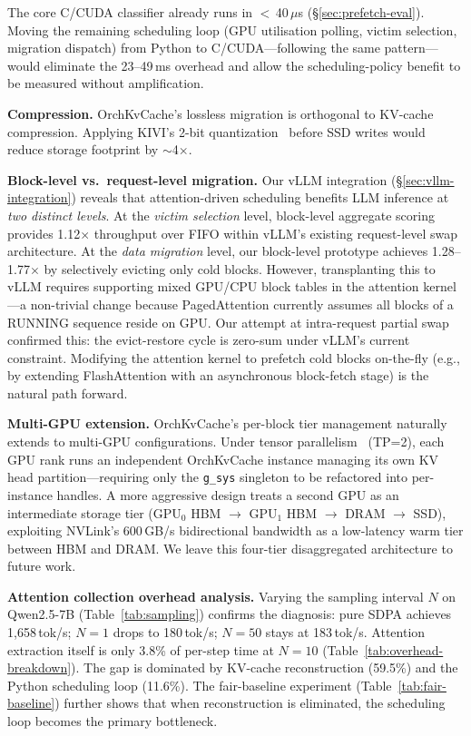 \documentclass[conference]{IEEEtran}
\begin{document}
The core C/CUDA classifier already runs in $<$\,40\,$\mu$s (\S\ref{sec:prefetch-eval}).  Moving the remaining scheduling loop (GPU utilisation polling, victim selection, migration dispatch) from Python to C/CUDA---following the same pattern---would eliminate the 23--49\,ms overhead and allow the scheduling-policy benefit to be measured without amplification.

\textbf{Compression.} OrchKvCache's lossless migration is orthogonal to KV-cache compression. Applying KIVI's 2-bit quantization~\cite{kivi} before SSD writes would reduce storage footprint by ${\sim}$4$\times$.

\textbf{Block-level vs.\ request-level migration.}
\label{sec:discussion}
Our vLLM integration (\S\ref{sec:vllm-integration}) reveals that attention-driven scheduling benefits LLM inference at \emph{two distinct levels}. At the \emph{victim selection} level, block-level aggregate scoring provides 1.12$\times$ throughput over FIFO within vLLM's existing request-level swap architecture. At the \emph{data migration} level, our block-level prototype achieves 1.28--1.77$\times$ by selectively evicting only cold blocks. However, transplanting this to vLLM requires supporting mixed GPU/CPU block tables in the attention kernel---a non-trivial change because PagedAttention currently assumes all blocks of a RUNNING sequence reside on GPU. Our attempt at intra-request partial swap confirmed this: the evict-restore cycle is zero-sum under vLLM's current constraint. Modifying the attention kernel to prefetch cold blocks on-the-fly (e.g., by extending FlashAttention with an asynchronous block-fetch stage) is the natural path forward.

\textbf{Multi-GPU extension.} OrchKvCache's per-block tier management naturally extends to multi-GPU configurations. Under tensor parallelism~\cite{megatron} (TP=2), each GPU rank runs an independent OrchKvCache instance managing its own KV head partition---requiring only the \texttt{g\_sys} singleton to be refactored into per-instance handles. A more aggressive design treats a second GPU as an intermediate storage tier (GPU$_0$ HBM $\to$ GPU$_1$ HBM $\to$ DRAM $\to$ SSD), exploiting NVLink's 600\,GB/s bidirectional bandwidth as a low-latency warm tier between HBM and DRAM. We leave this four-tier disaggregated architecture to future work.

\textbf{Attention collection overhead analysis.}
Varying the sampling interval $N$ on Qwen2.5-7B (Table~\ref{tab:sampling}) confirms the diagnosis: pure SDPA achieves 1,658\,tok/s; $N{=}1$ drops to 180\,tok/s; $N{=}50$ stays at 183\,tok/s.  Attention extraction itself is only 3.8\% of per-step time at $N{=}10$ (Table~\ref{tab:overhead-breakdown}).  The gap is dominated by KV-cache reconstruction (59.5\%) and the Python scheduling loop (11.6\%).  The fair-baseline experiment (Table~\ref{tab:fair-baseline}) further shows that when reconstruction is eliminated, the scheduling loop becomes the primary bottleneck.
\end{document}

